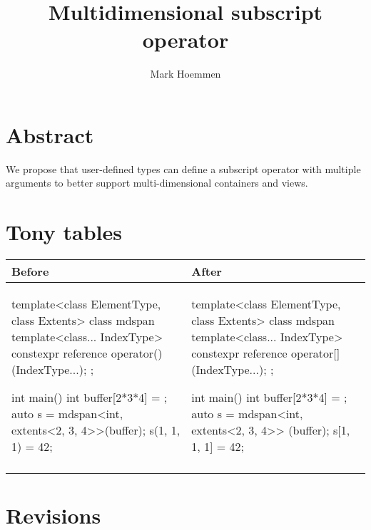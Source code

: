 \documentclass{wg21}
\title{Multidimensional subscript operator}
\author{Mark Hoemmen}{mhoemmen@stellarscience.com}
\begin{document}
\maketitle


\section{Abstract}

We propose that user-defined types can define a subscript operator with multiple arguments to better support multi-dimensional containers and views.

\section{Tony tables}
\begin{center}
\begin{tabular}{l|l}
Before & After\\ \hline

\begin{minipage}[t]{0.55\textwidth}
\begin{colorblock}
template<class ElementType, class Extents>
class mdspan {
  template<class... IndexType>
  constexpr reference operator()(IndexType...);
};

int main() {
  int buffer[2*3*4] = { };
  auto s = mdspan<int, extents<2, 3, 4>>(buffer);
  s(1, 1, 1) = 42;
}
\end{colorblock}
\end{minipage}
&
\begin{minipage}[t]{0.5\textwidth}
\begin{colorblock}
template<class ElementType, class Extents>
class mdspan {
  template<class... IndexType>
  constexpr reference operator[](IndexType...);
};

int main() {
  int buffer[2*3*4] = { };
  auto s = mdspan<int, extents<2, 3, 4>> (buffer);
  s[1, 1, 1] = 42;
}
\end{colorblock}
\end{minipage}
\\\\ \hline

\end{tabular}
\end{center}

\section{Revisions}
\end{document}
